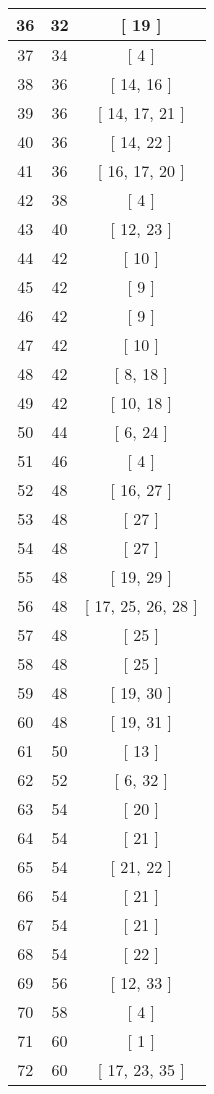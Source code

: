 \begin{center}
\begin{longtable}[H]{|| c c c ||}
\hline
36 & 32 & [ 19 ] \\ 
\hline
37 & 34 & [ 4 ] \\ 
\hline
38 & 36 & [ 14, 16 ] \\ 
\hline
39 & 36 & [ 14, 17, 21 ] \\ 
\hline
40 & 36 & [ 14, 22 ] \\ 
\hline
41 & 36 & [ 16, 17, 20 ] \\ 
\hline
42 & 38 & [ 4 ] \\ 
\hline
43 & 40 & [ 12, 23 ] \\ 
\hline
44 & 42 & [ 10 ] \\ 
\hline
45 & 42 & [ 9 ] \\ 
\hline
46 & 42 & [ 9 ] \\ 
\hline
47 & 42 & [ 10 ] \\ 
\hline
48 & 42 & [ 8, 18 ] \\ 
\hline
49 & 42 & [ 10, 18 ] \\ 
\hline
50 & 44 & [ 6, 24 ] \\ 
\hline
51 & 46 & [ 4 ] \\ 
\hline
52 & 48 & [ 16, 27 ] \\ 
\hline
53 & 48 & [ 27 ] \\ 
\hline
54 & 48 & [ 27 ] \\ 
\hline
55 & 48 & [ 19, 29 ] \\ 
\hline
56 & 48 & [ 17, 25, 26, 28 ] \\ 
\hline
57 & 48 & [ 25 ] \\ 
\hline
58 & 48 & [ 25 ] \\ 
\hline
59 & 48 & [ 19, 30 ] \\ 
\hline
60 & 48 & [ 19, 31 ] \\ 
\hline
61 & 50 & [ 13 ] \\ 
\hline
62 & 52 & [ 6, 32 ] \\ 
\hline
63 & 54 & [ 20 ] \\ 
\hline
64 & 54 & [ 21 ] \\ 
\hline
65 & 54 & [ 21, 22 ] \\ 
\hline
66 & 54 & [ 21 ] \\ 
\hline
67 & 54 & [ 21 ] \\ 
\hline
68 & 54 & [ 22 ] \\ 
\hline
69 & 56 & [ 12, 33 ] \\ 
\hline
70 & 58 & [ 4 ] \\ 
\hline
71 & 60 & [ 1 ] \\ 
\hline
72 & 60 & [ 17, 23, 35 ] \\ 
\hline

\end{longtable}
\end{center}
